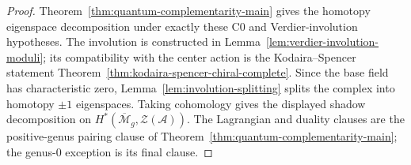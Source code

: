 \begin{proof}
Theorem~\ref{thm:quantum-complementarity-main} gives the homotopy
eigenspace decomposition under exactly these C0 and
Verdier-involution hypotheses. The involution is constructed in
Lemma~\ref{lem:verdier-involution-moduli}; its compatibility with the
center action is the Kodaira--Spencer statement
Theorem~\ref{thm:kodaira-spencer-chiral-complete}. Since the base
field has characteristic zero, Lemma~\ref{lem:involution-splitting}
splits the complex into homotopy $\pm1$ eigenspaces. Taking
cohomology gives the displayed shadow decomposition on
$H^*(\overline{\mathcal{M}}_g,\mathcal{Z}(\mathcal{A}))$. The
Lagrangian and duality clauses are the positive-genus pairing clause
of Theorem~\ref{thm:quantum-complementarity-main}; the genus-$0$
exception is its final clause.
\end{proof}
